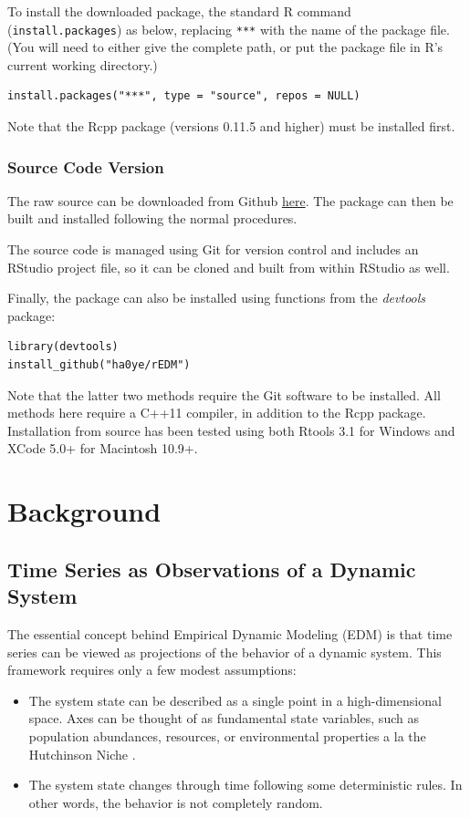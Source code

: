 To install the downloaded package, the standard R command (\lstinline{install.packages}) as below, replacing \lstinline{***} with the name of the package file. (You will need to either give the complete path, or put the package file in R's current working directory.)

\begin{lstlisting}
install.packages("***", type = "source", repos = NULL)
\end{lstlisting}

Note that the Rcpp package (versions 0.11.5 and higher) must be installed first.

\subsubsection{Source Code Version}
The raw source can be downloaded from Github \href{https://github.com/ha0ye/rEDM}{here}. The package can then be built and installed following the normal procedures.

The source code is managed using Git for version control and includes an RStudio project file, so it can be cloned and built from within RStudio as well.

Finally, the package can also be installed using functions from the \emph{devtools} package:

\begin{lstlisting}
library(devtools)
install_github("ha0ye/rEDM")
\end{lstlisting}

Note that the latter two methods require the Git software to be installed. All methods here require a C++11 compiler, in addition to the Rcpp package. Installation from source has been tested using both Rtools 3.1 for Windows and XCode 5.0+ for Macintosh 10.9+.

\section{Background}

\subsection{Time Series as Observations of a Dynamic System}

The essential concept behind Empirical Dynamic Modeling (EDM) is that time series can be viewed as projections of the behavior of a dynamic system. This framework requires only a few modest assumptions:
\begin{itemize}
\item The system state can be described as a single point in a high-dimensional space. Axes can be thought of as fundamental state variables, such as population abundances, resources, or environmental properties a la the Hutchinson Niche \cite{Hutchinson_1957}.
\item The system state changes through time following some deterministic rules. In other words, the behavior is not completely random.
\end{itemize}

